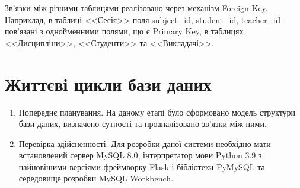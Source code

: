 Зв'язки між різними таблицями реалізовано через механізм Foreign Key.
Наприклад, в таблиці <<Сесія>> поля subject\_id, student\_id, teacher\_id 
пов'язані з однойменними полями, що є Primary Key, в таблицях <<Дисципліни>>, <<Студенти>> та <<Викладачі>>.

\section{Життєві цикли бази даних}
\begin{enumerate}
    \item Попереднє планування. На даному етапі було сформовано модель структури бази даних, визначено сутності та
    проаналізовано зв'язки між ними.
    \item Перевірка здійсненності. Для розробки даної системи необхідно мати встановлений сервер MySQL 8.0,
    інтерпретатор мови Python 3.9 з найновішими версіями фреймворку Flask і бібліотеки PyMySQL та
    середовище розробки MySQL Workbench. 
\end{enumerate}